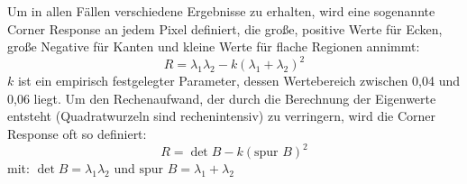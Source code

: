 \newpage

Um in allen Fällen verschiedene Ergebnisse zu erhalten, wird eine sogenannte Corner Response an jedem Pixel definiert, die große, positive Werte für Ecken, große Negative für Kanten und kleine Werte für flache Regionen annimmt:
\begin{equation}
R = \lambda_1\lambda_2 - k(\lambda_1 + \lambda_2)^2
\end{equation}
$k$ ist ein empirisch festgelegter Parameter, dessen Wertebereich zwischen 0,04 und 0,06 liegt.
Um den Rechenaufwand, der durch die Berechnung der Eigenwerte entsteht (Quadratwurzeln sind rechenintensiv) zu verringern, wird die Corner Response oft so definiert:
\begin{equation}
R = \det{B} - k(\text{spur\ } B)^2
\end{equation}
mit: $\det{B} = \lambda_1\lambda_2$ und $\text{spur\ } B = \lambda_1+\lambda_2$\\

